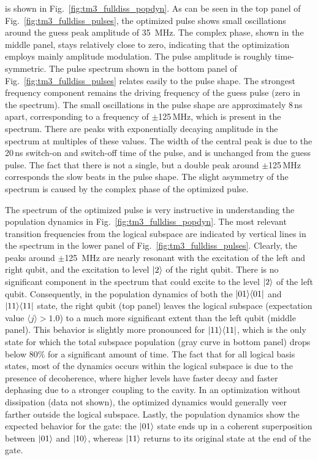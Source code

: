 is shown in Fig.~\ref{fig:tm3_fulldiss_popdyn}.
As can be seen in the top panel of Fig.~\ref{fig:tm3_fulldiss_pulses}, the optimized
pulse shows small oscillations around the guess peak amplitude of 35~MHz. The complex
phase, shown in the middle panel, stays relatively close to zero, indicating
that the optimization employs mainly amplitude modulation. The pulse
amplitude is roughly time-symmetric. The pulse spectrum shown in the
bottom panel of Fig.~\ref{fig:tm3_fulldiss_pulses}
relates easily to the pulse shape. The strongest frequency component remains the
driving frequency of the guess pulse (zero in the spectrum). The small
oscillations in the pulse shape are approximately 8$\,$ns apart, corresponding to
a frequency of $\pm$125$\,$MHz, which is present in the spectrum. There are peaks
with exponentially decaying amplitude in the spectrum at multiples of these
values. The width of the central peak is due to the 20$\,$ns switch-on and
switch-off time of the pulse, and is unchanged from the guess pulse. The
fact that there is not a single, but a double peak around $\pm$125$\,$MHz
corresponds the slow beats in the pulse shape.  The slight asymmetry of the
spectrum is caused by the complex phase of the optimized pulse.

The spectrum of the optimized pulse is very instructive in understanding the
population dynamics in Fig.~\ref{fig:tm3_fulldiss_popdyn}. The most relevant
transition frequencies from the logical subspace are indicated by vertical lines
in the spectrum in the lower panel of Fig.~\ref{fig:tm3_fulldiss_pulses}. Clearly,
the peaks around $\pm$125~MHz are nearly resonant with the excitation of the
left and right qubit, and the excitation to level $\Ket{2}$ of the right qubit.
There is no significant component in the spectrum that could excite to the level
$\Ket{2}$ of the left qubit.
Consequently, in the population dynamics of both the $\Ket{01}\!\Bra{01}$ and
$\Ket{11}\!\Bra{11}$ state, the right qubit (top panel) leaves the logical
subspace (expectation value $\langle j\rangle>1.0$) to a much more
significant extent than the
left qubit (middle panel). This behavior is slightly more pronounced for
$\Ket{11}\!\Bra{11}$, which is the only state for which the total subspace
population (gray curve in bottom panel) drops below 80\% for a significant
amount of time.
The fact that for all logical basis states, most of the dynamics
occurs within the logical
subspace is due to the presence of decoherence, where higher levels have
faster decay and faster dephasing due to a stronger coupling to the cavity. In an
optimization without dissipation (data not shown), the optimized dynamics would
generally veer farther outside the logical subspace. Lastly, the population
dynamics show the expected behavior for the \sqrtISWAP{} gate: the $\Ket{01}$
state ends up in a coherent superposition between $\Ket{01}$ and $\Ket{10}$,
whereas $\Ket{11}$ returns to its original state at the end of the gate.


